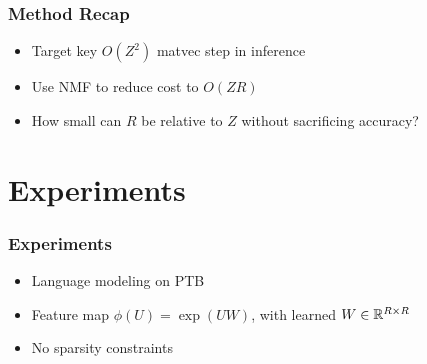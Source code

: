 \documentclass{beamer}
\begin{document}
\begin{frame}
\frametitle{Method Recap}
\begin{itemize}
\item Target key $O(Z^2)$ matvec step in inference
\vspace{2em}
\item Use NMF to reduce cost to $O(ZR)$
\vspace{2em}
\item How small can $R$ be relative to $Z$ without sacrificing accuracy?
\end{itemize}
\end{frame}


\section{Experiments}

\begin{frame}
\frametitle{Experiments}
\begin{itemize}
\item Language modeling on PTB
\vspace{2em}
\item Feature map $\phi(U) = \exp\left(U W\right)$,
with learned $W\in\mathbb{R}^{R \times R}$
\vspace{2em}
\item No sparsity constraints
\end{itemize}
\end{frame}
\end{document}

